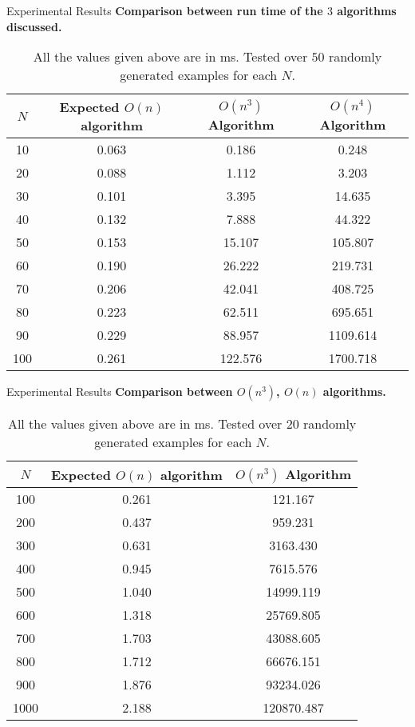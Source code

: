 \documentclass{beamer}
\begin{document}
\begin{frame}{Experimental Results}
\textbf{Comparison between run time of the $3$ algorithms discussed.}
\begin{table}
\centering
\begin{tabular}{|c| c |c |c|} 
 \hline\hline
 $N$ & Expected $O(n)$ algorithm & $O(n^3)$ Algorithm & $O(n^4)$ Algorithm \\ [0.5ex] 
 \hline\hline
10 & 0.063 & 0.186 & 0.248 \\ \hline
20 & 0.088 & 1.112 & 3.203 \\ \hline
30 & 0.101 & 3.395 & 14.635 \\ \hline
40 & 0.132 & 7.888 & 44.322 \\ \hline
50 & 0.153 & 15.107 & 105.807 \\ \hline
60 & 0.190 & 26.222 & 219.731 \\ \hline
70 & 0.206 & 42.041 & 408.725 \\ \hline
80 & 0.223 & 62.511 & 695.651\\ \hline
90 & 0.229 & 88.957 & 1109.614 \\ \hline
100 & 0.261 & 122.576 & 1700.718\\ \hline
\end{tabular}
\caption{All the values given above are in ms. Tested over $50$ randomly generated examples for each $N$.}
\label{Talbe}
\end{table}
\end{frame}


\begin{frame}{Experimental Results}
\textbf{Comparison between $O(n^3)$, $O(n)$ algorithms.}
\begin{table}
\centering
\begin{tabular}{|c| c |c |} 
 \hline\hline
 $N$ & Expected $O(n)$ algorithm & $O(n^3)$ Algorithm \\ [0.5ex] 
 \hline\hline
100 & 0.261 & 121.167 \\ \hline
200 & 0.437  & 959.231\\ \hline

300 & 0.631 & 3163.430
 \\ \hline

400 & 0.945 & 7615.576
 \\ \hline

500 & 1.040 & 14999.119
 \\ \hline

600 & 1.318 & 25769.805
 \\ \hline

700 & 1.703 & 43088.605
\\ \hline

800 & 1.712 & 66676.151
\\ \hline

900 & 1.876 & 93234.026
 \\ \hline

1000 & 2.188 & 120870.487
\\ \hline
\end{tabular}
\caption{All the values given above are in ms. Tested over $20$ randomly generated examples for each $N$.}
\end{table}
\end{frame}
\end{document}
